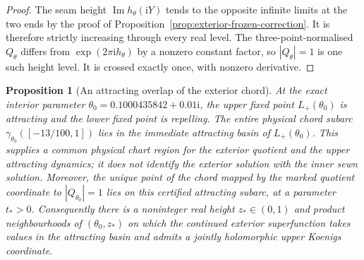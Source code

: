 \documentclass[11pt]{amsart}
\newtheorem{proposition}[theorem]{Proposition}
\theoremstyle{definition}
\newcommand{\ii}{\mathrm{i}}
\begin{document}
\begin{proof}
The seam height $\operatorname{Im}h_\theta(\ii Y)$ tends to the
opposite infinite limits at the two ends by the proof of
Proposition~\ref{prop:exterior-frozen-correction}.
It is therefore strictly increasing through every real level.
The three-point-normalised $Q_\theta$ differs from
$\exp(2\pi\ii h_\theta)$ by a nonzero constant factor, so
$|Q_\theta|=1$ is one such height level.  It is crossed exactly
once, with nonzero derivative.
\end{proof}

\begin{proposition}[An attracting overlap of the exterior chord]
\label{prop:interior-chord-overlap}
At the exact interior parameter
$\theta_0=0.1000435842+0.01\ii$, the upper fixed point
$L_+(\theta_0)$ is attracting and the lower fixed point is
repelling.  The entire physical chord subarc
$\gamma_{\theta_0}([-13/100,1])$ lies in the immediate attracting
basin of $L_+(\theta_0)$.  This supplies a common physical chart
region for the exterior quotient and the upper attracting dynamics;
it does not identify the exterior solution with the inner sewn
solution.  Moreover, the unique point of the chord mapped by the
marked quotient coordinate to $|Q_{\theta_0}|=1$ lies on this
certified attracting subarc, at a parameter $t_*>0$.
Consequently there is a noninteger real height $z_*\in(0,1)$
and product neighbourhoods of $(\theta_0,z_*)$ on which the
continued exterior superfunction takes values in the attracting
basin and admits a jointly holomorphic upper Koenigs coordinate.
\end{proposition}
\end{document}
